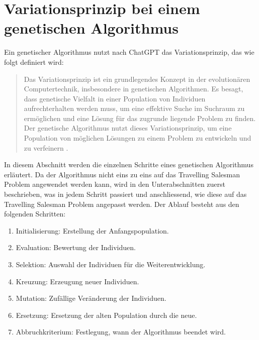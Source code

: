 %
%
%
%
\section{Variationsprinzip bei einem genetischen Algorithmus
\label{buch:paper:varalg:section:genetic_algorithm_process}}
Ein genetischer Algorithmus nutzt nach ChatGPT das Variationsprinzip, 
das wie folgt definiert wird:
\begin{quote}
Das Variationsprinzip ist ein grundlegendes Konzept in der 
evolutionären Computertechnik, insbesondere in genetischen 
Algorithmen. Es besagt, dass genetische Vielfalt in einer 
Population von Individuen aufrechterhalten werden muss, 
um eine effektive Suche im Suchraum zu ermöglichen und eine 
Lösung für das zugrunde liegende Problem zu finden.
\\
Der genetische Algorithmus nutzt dieses Variationsprinzip, um eine 
Population von möglichen Lösungen zu einem Problem zu entwickeln 
und zu verfeinern \cite{varalg:chatgpt2024}.
\end{quote}
In diesem Abschnitt werden die einzelnen Schritte eines genetischen Algorithmus 
erläutert. Da der Algorithmus nicht eins zu eins auf das Travelling Salesman
Problem angewendet werden kann, wird in den Unterabschnitten zuerst beschrieben,
was in jedem Schritt passiert und anschliessend, wie diese auf das Travelling 
Salesman Problem angepasst werden.
Der Ablauf besteht aus den folgenden Schritten:
\begin{enumerate}
    \item Initialisierung: Erstellung der Anfangspopulation.
    \item Evaluation: Bewertung der Individuen.
    \item Selektion: Auswahl der Individuen für die Weiterentwicklung.
    \item Kreuzung: Erzeugung neuer Individuen.
    \item Mutation: Zufällige Veränderung der Individuen.
    \item Ersetzung: Ersetzung der alten Population durch die neue.
    \item Abbruchkriterium: Festlegung, wann der Algorithmus beendet wird.
\end{enumerate}








